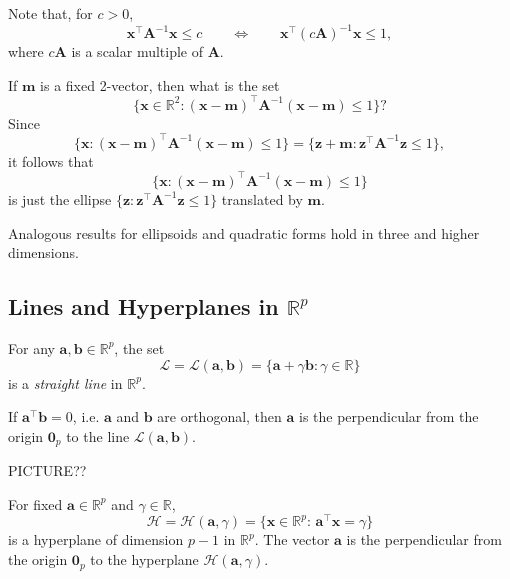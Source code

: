 \documentclass[]{book}
\theoremstyle{definition}
\theoremstyle{definition}
\theoremstyle{definition}
\theoremstyle{remark}
\begin{document}
Note that, for \(c>0\),
\[{\mathbf x}^\top {\mathbf A}^{-1} {\mathbf x}\leq c \qquad \Leftrightarrow \qquad {\mathbf x}^\top (c{\mathbf A})^{-1}{\mathbf x}\leq 1 ,\]
where \(c{\mathbf A}\) is a scalar multiple of \(\mathbf A\).

If \({\mathbf m}\) is a fixed 2-vector, then what is the set
\[
\{ {\mathbf x} \in \mathbb{R}^2 : ({\mathbf x}-{\mathbf m})^\top {\mathbf A}^{-1}({\mathbf x}-{\mathbf m})\leq 1\} ?
\]
Since
\[
\{ {\mathbf x} : ({\mathbf x}-{\mathbf m})^\top {\mathbf A}^{-1}({\mathbf x}-{\mathbf m})\leq 1 \}=\{ {\mathbf z}+
{\mathbf m} : {\mathbf z}^\top {\mathbf A}^{-1} {\mathbf z}\leq 1 \} ,
\]
it follows that
\[
\{ {\mathbf x} : ({\mathbf x}-{\mathbf m})^\top {\mathbf A}^{-1}({\mathbf x}-{\mathbf m})\leq 1\}
\]
is just the ellipse \(\{ {\mathbf z}:{\mathbf z}^\top {\mathbf A}^{-1}{\mathbf z}\leq 1\}\) translated by
\({\mathbf m}\).

Analogous results for ellipsoids and quadratic forms hold in three and higher dimensions.

\hypertarget{lines-and-hyperplanes-in-mathbbrp}{%
\subsection{\texorpdfstring{Lines and Hyperplanes in \(\mathbb{R}^p\)}{Lines and Hyperplanes in \textbackslash{}mathbb\{R\}\^{}p}}\label{lines-and-hyperplanes-in-mathbbrp}}

For any \(\boldsymbol a, \boldsymbol b\in \mathbb{R}^p\), the set
\begin{equation}
\mathcal{L}=\mathcal{L}(\boldsymbol a, \boldsymbol b)=\{\boldsymbol a+\gamma \boldsymbol b: \gamma \in \mathbb{R}\}
\label{eq:straightl} 
\end{equation}
is a \emph{straight line} in \(\mathbb{R}^p\).

If \(\boldsymbol a^\top \boldsymbol b=0\), i.e. \(\boldsymbol a\) and \(\boldsymbol b\) are orthogonal, then \(\boldsymbol a\) is the perpendicular from the origin \({\mathbf 0}_p\)
to the line \(\mathcal{L}(\boldsymbol a,\boldsymbol b).\)

PICTURE??

For fixed \(\boldsymbol a\in \mathbb{R}^p\) and \(\gamma \in \mathbb{R}\),
\[
\mathcal{H}=\mathcal{H}(\boldsymbol a, \gamma) =\{\boldsymbol x\in \mathbb{R}^p:\, \boldsymbol a^\top \boldsymbol x=\gamma\}
\]
is a hyperplane of dimension \(p-1\) in \(\mathbb{R}^p\). The vector \(\boldsymbol a\) is the perpendicular from the origin \({\mathbf 0}_p\) to the hyperplane \(\mathcal{H}(\boldsymbol a, \gamma)\).
\end{document}
